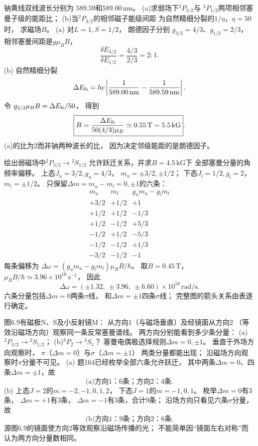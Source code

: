 钠黄线双线波长分别为
$589.59$和$589.00\,\mathrm{nm}$。
(a)求弱场下\({}^{2}P_{3/2}\)与
\({}^{2}P_{1/2}\)两项相邻塞曼子级的能距比；
(b)当\({}^{2}P_{3/2}\)的相邻磁子能级间距
为自然精细分裂的$1/\eta$，$\eta=50$时，
求磁场$B$。
\exsolution
(a) 对$L=1,S=1/2$，
朗德因子分别
$g_{3/2}=4/3$、$g_{1/2}=2/3$，
相邻塞曼间距是$g\mu_BB$，
\[
 \boxed{\frac{\delta E_{3/2}}{\delta E_{1/2}}
 =\frac{4/3}{2/3}=2:1}.
\]
(b) 自然精细分裂
\[
 \Delta E_{\rm fs}=hc\left|
 \frac1{589.00\,\mathrm{nm}}-
 \frac1{589.59\,\mathrm{nm}}\right|.
\]
令
$g_{3/2}\mu_BB=\Delta E_{\rm fs}/50$，
得到
\[
 \boxed{B=\frac{\Delta E_{\rm fs}}
 {50(4/3)\mu_B}
 \simeq0.55\,\mathrm T=5.5\,\mathrm{kG}}.
\]
\excheck (a)的比为2而非钠两种波长的比，
因为决定邻级能距的是朗德因子。

绘出弱磁场中\({}^{2}P_{3/2}\to{}^{2}S_{1/2}\)
允许跃迁关系，并求$B=4.5\,\mathrm{kG}$下
全部塞曼分量的角频率偏移。
\exsolution
上态$J_u=3/2,g_u=4/3$，
$m_u=\pm3/2,\pm1/2$；
下态$J_l=1/2,g_l=2$，
$m_l=\pm1/2$。
只保留$\Delta m=m_u-m_l=0,\pm1$的六条：
\[
 \begin{array}{c|c|c}
 m_u&m_l&g_um_u-g_lm_l\\\hline
 +3/2&+1/2&+1\\
 +1/2&+1/2&-1/3\\
 +1/2&-1/2&+5/3\\
 -1/2&+1/2&-5/3\\
 -1/2&-1/2&+1/3\\
 -3/2&-1/2&-1
 \end{array}
\]
每条偏移为
$\Delta\omega=(g_um_u-g_lm_l)\mu_BB/\hbar$。
取$B=0.45\,\mathrm T$，
$\mu_BB/\hbar\simeq3.96\times10^{10}\,\mathrm{s^{-1}}$，
因此
\[
 \boxed{\Delta\omega=
 (\pm1.32,\ \pm3.96,\ \pm6.60)\times10^{10}\,
 \mathrm{rad/s}}.
\]
\excheck 六条分量包括$\Delta m=0$两条$\pi$线，
和$\Delta m=\pm1$四条$\sigma$线；
完整图的箭头关系由表逐行确定。

图6.9有磁极N、S及小反射镜M：
从方向1（与磁场垂直）及经镜面从方向2
（等效沿磁场方向）观察同一条反常塞曼谱线。
两方向分别能看到多少条分量：
(a)\({}^{2}P_{3/2}\to{}^{2}S_{1/2}\)；
(b)\({}^{3}P_2\to{}^{3}S_1\)？
\exsolution
塞曼电偶极选择规则$\Delta m=0,\pm1$。
垂直于外场方向观察时，
$\pi$（$\Delta m=0$）与$\sigma$（$\Delta m=\pm1$）
两类分量都能出现；
沿磁场方向观察时$\pi$分量不可见。
(a) 题164已经枚举全部六条允许跃迁，
其中两条$\Delta m=0$、四条$\Delta m=\pm1$，故
\[
 \boxed{\text{(a)方向1：6条；方向2：4条}}.
\]
(b) 上态$J=2$的$m=-2,-1,0,1,2$，
下态$J=1$的$m=-1,0,1$。
枚举$\Delta m=0$有3条，
$\Delta m=+1$有3条，
$\Delta m=-1$有3条，合计9条；
沿场方向只看见六条$\sigma$分量，故
\[
 \boxed{\text{(b)方向1：9条；方向2：6条}}.
\]
\excheck 源图6.9的镜面使方向2等效观察沿磁场传播的光；
不能简单因“镜面左右对称”而认为两方向分量数相同。


